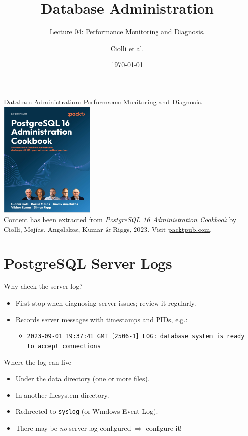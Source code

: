 \documentclass[aspectratio=169]{beamer}
\title[Monitoring]{Database Administration}
\subtitle{Lecture 04: Performance Monitoring and Diagnosis.}
\author{Ciolli et al.}
\date{\today}
\begin{document}
\frame{\titlepage}

\begin{frame}{Database Administration: Performance Monitoring and Diagnosis.}
    \centering
    \includegraphics[width=0.35\textwidth]{figures/book_cover4}\\
    \vspace{2mm}
    {
        \scriptsize
        Content has been extracted from \textit{PostgreSQL 16 Administration Cookbook} by Ciolli, Mejías, Angelakos, Kumar \& Riggs, 2023. Visit \href{https://www.packtpub.com/en-us/product/postgresql-16-administration-cookbook-9781835468449}{packtpub.com}.
    }
\end{frame}

\section{PostgreSQL Server Logs}

\begin{frame}{Why check the server log?}
  \begin{itemize}
    \item First stop when diagnosing server issues; review it regularly.
    \item Records server messages with timestamps and PIDs, e.g.:
    \begin{itemize}
        \item \texttt{2023-09-01 19:37:41 GMT [2506-1] LOG: database system is ready to accept connections}
    \end{itemize}
  \end{itemize}
\end{frame}

\begin{frame}{Where the log can live}
  \begin{itemize}
    \item Under the data directory (one or more files).
    \item In another filesystem directory.
    \item Redirected to \texttt{syslog} (or Windows Event Log).
    \item There may be \emph{no} server log configured $\Rightarrow$ configure it!
  \end{itemize}
\end{frame}
\end{document}
